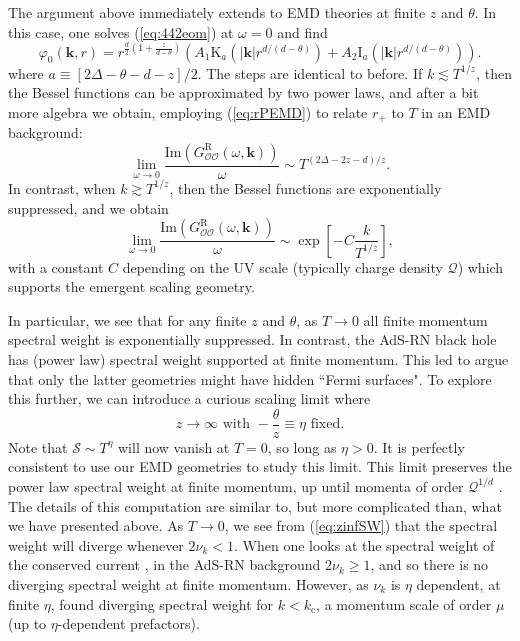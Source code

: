\documentclass[10pt, oneside]{book}
\begin{document}
\begin{doublespace}
The argument above immediately extends to EMD theories at finite $z$ and $\theta$.   In this case, one solves (\ref{eq:442eom}) at $\omega=0$ and find \cite{lucas1401} \begin{equation} 
\varphi_0(\mathbf{k},r) = r^{\frac{d}{2}(1+\frac{z}{d-\theta})} \left(A_1 \mathrm{K}_a(|\mathbf{k}| r^{d/(d-\theta)})  + A_2 \mathrm{I}_a(|\mathbf{k}| r^{d/(d-\theta)})\right).
\end{equation}
where $a \equiv [2\Delta-\theta-d-z]/2$.   The steps are identical to before.   If $k\lesssim T^{1/z}$,  then the Bessel functions can be approximated by two power laws, and after a bit more algebra we obtain, employing (\ref{eq:rPEMD}) to relate $r_+$ to $T$ in an EMD background: \begin{equation}
\lim_{\omega \rightarrow 0} \frac{\mathrm{Im}\left(G^{\mathrm{R}}_{\mathcal{OO}}(\omega,\mathbf{k})\right)}{\omega}\sim T^{(2\Delta-2z-d)/z}.  \label{eq:GOOT}
\end{equation}
In contrast, when $k\gtrsim T^{1/z}$, then the Bessel functions are exponentially suppressed, and we obtain \begin{equation}
\lim_{\omega \rightarrow 0} \frac{\mathrm{Im}\left(G^{\mathrm{R}}_{\mathcal{OO}}(\omega,\mathbf{k})\right)}{\omega}\sim \exp\left[ - C \frac{k}{T^{1/z}}\right],
\end{equation}
with a constant $C$ depending on the UV scale (typically charge density $\mathcal{Q}$) which supports the emergent scaling geometry.    

In particular, we see that for any finite $z$ and $\theta$,  as $T\rightarrow 0$ all finite momentum spectral weight is exponentially suppressed.   In contrast, the AdS-RN black hole has (power law) spectral weight supported at finite momentum.  This led \cite{Hartnoll:2012wm} to argue that only the latter geometries might have hidden ``Fermi surfaces".   To explore this further, we can introduce a curious scaling limit where \begin{equation}
z\rightarrow \infty \text{ with } -\frac{\theta}{z} \equiv \eta \text{ fixed}.
\end{equation}
Note that $\mathcal{S}\sim T^\eta$ will now vanish at $T=0$, so long as $\eta>0$.   It is perfectly consistent to use our EMD geometries to study this limit.    This limit preserves the power law spectral weight at finite momentum, up until momenta of order $\mathcal{Q}^{1/d}$ \cite{Hartnoll:2012wm}.   The details of this computation are similar to, but more complicated than, what we have presented above.  As $T\rightarrow 0$, we see from (\ref{eq:zinfSW}) that the spectral weight will diverge whenever $2\nu_k < 1$.    When one looks at the spectral weight of the conserved current \cite{Anantua:2012nj},  in the AdS-RN background  $2\nu_k \ge 1$, and so there is no diverging spectral weight at finite momentum.   However, as $\nu_k$ is $\eta$ dependent, at finite $\eta$, \cite{Anantua:2012nj} found diverging spectral weight for $k<k_{\mathrm{c}}$, a momentum scale of order $\mu$ (up to $\eta$-dependent prefactors).


\end{doublespace}
\end{document}
